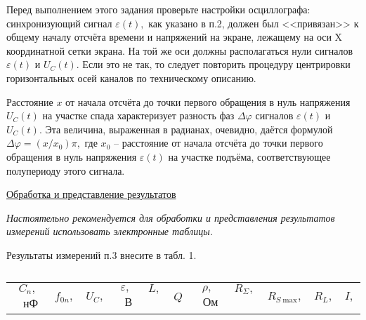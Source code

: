 \begin{lab:task}
		\par
		    Перед выполнением этого задания проверьте настройки осциллографа: синхрони\-зующий сигнал $\varepsilon(t),$ как указано в п.2, должен был <<привязан>> к общему началу отсчёта времени и напряжений на экране, лежащему на оси X координатной сетки экрана. На той же оси должны располагаться нули сигналов $\varepsilon(t)$ и $U_C(t).$ Если это не так, то следует повторить процедуру центрировки горизонтальных осей каналов по техническому описанию. \par
		
		    Расстояние $x$ от начала отсчёта до точки первого обращения в нуль напряжения $U_C(t)$ на участке спада характеризует разность фаз $\Delta\varphi$ сигналов $\varepsilon(t)$ и $U_C(t).$ Эта величина, выраженная в радианах, очевидно, даётся формулой $\Delta\varphi=(x/x_0)\pi,$ где $x_0$ – расстояние от начала отсчёта до точки первого обращения в нуль напряжения $\varepsilon(t)$ на участке подъёма, соответствующее полупериоду этого сигнала.
		
		    \begin{center}
		    \underline{Обработка и представление результатов}
		    \end{center}
		    \par
		    \emph{Настоятельно рекомендуется для обработки и представления результатов измерений использовать электронные таблицы.}
		
		    \item[7.]Результаты измерений п.3 внесите в табл. 1.
		    \begin{center}
		        \begin{table}[tb!]
		            \caption{\label{tab:1}}
		            \begin{center}
		                \begin{tabular}{|c|c|c|c|c|c|c|c|c|c|c|}
		                    \hline
		                    $C_n,$~нФ& $f_{0n},$& $U_C,$& $\varepsilon,$~В& $L,$~& $Q$& $\rho,$~Ом& $R_{\Sigma},$~& $R_{S~\text{max}},$& $R_L,$& $I,$\\
		

\end{tabular}
\end{center}
\end{table}
\end{center}
\end{lab:task}

